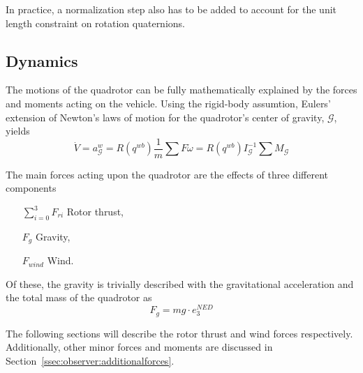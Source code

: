         In practice, a normalization step also has to be added to account for
        the unit length constraint on rotation quaternions.


    \subsection{Dynamics}
        The motions of the quadrotor can be fully mathematically explained by the
        forces and moments acting on the vehicle. Using the rigid-body assumtion,
        Eulers' extension of Newton's laws of motion for the
        quadrotor's center of gravity, $\mathcal{G}$, yields
        \begin{subequations}
            \begin{equation}
                \dot{V} = a^{w}_{\mathcal{G}} = R(q^{wb})\frac{1}{m}\sum F
            \end{equation}
            \begin{equation}
                \dot{\omega} = R(q^{wb})I_{\mathcal{G}}^{-1}\sum M_{\mathcal{G}}
            \end{equation}
        \end{subequations}

        The main forces acting upon the quadrotor are the effects of three different components
        \begin{itemize}
            \item[$\sum_{i=0}^{3}F_{ri}$] Rotor thrust,
            \item[$F_{g}$] Gravity,
            \item[$F_{wind}$] Wind.
        \end{itemize}

        Of these, the gravity is trivially described with the
        gravitational acceleration and the total mass of the quadrotor as
        \begin{equation}
            F_{g} = mg\cdot e_{3}^{NED}
        \end{equation}

        The following sections will describe the rotor thrust and wind forces respectively.
        Additionally, other minor forces and moments are discussed in
        Section~\ref{ssec:observer:additionalforces}.

        
        
        
